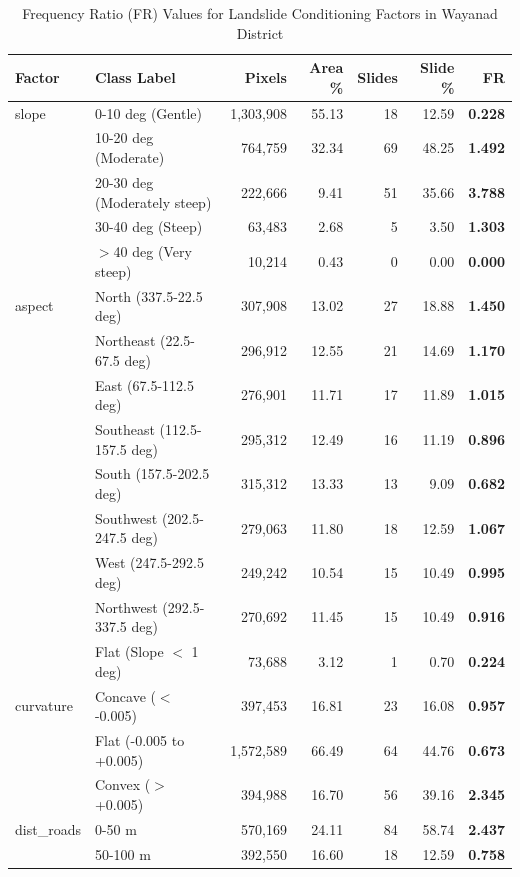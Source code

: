 \begin{table}[htbp]
\centering
\caption{Frequency Ratio (FR) Values for Landslide Conditioning Factors in Wayanad District}
\label{tab:fr_summary}
\begin{tabular}{llrrrrr}
\hline
\textbf{Factor} & \textbf{Class Label} & \textbf{Pixels} & \textbf{Area \%} & \textbf{Slides} & \textbf{Slide \%} & \textbf{FR} \\
\hline
slope & 0-10 deg (Gentle) & 1,303,908 & 55.13 & 18 & 12.59 & \textbf{0.228} \\
 & 10-20 deg (Moderate) & 764,759 & 32.34 & 69 & 48.25 & \textbf{1.492} \\
 & 20-30 deg (Moderately steep) & 222,666 & 9.41 & 51 & 35.66 & \textbf{3.788} \\
 & 30-40 deg (Steep) & 63,483 & 2.68 & 5 & 3.50 & \textbf{1.303} \\
 & $>$40 deg (Very steep) & 10,214 & 0.43 & 0 & 0.00 & \textbf{0.000} \\
aspect & North (337.5-22.5 deg) & 307,908 & 13.02 & 27 & 18.88 & \textbf{1.450} \\
 & Northeast (22.5-67.5 deg) & 296,912 & 12.55 & 21 & 14.69 & \textbf{1.170} \\
 & East (67.5-112.5 deg) & 276,901 & 11.71 & 17 & 11.89 & \textbf{1.015} \\
 & Southeast (112.5-157.5 deg) & 295,312 & 12.49 & 16 & 11.19 & \textbf{0.896} \\
 & South (157.5-202.5 deg) & 315,312 & 13.33 & 13 & 9.09 & \textbf{0.682} \\
 & Southwest (202.5-247.5 deg) & 279,063 & 11.80 & 18 & 12.59 & \textbf{1.067} \\
 & West (247.5-292.5 deg) & 249,242 & 10.54 & 15 & 10.49 & \textbf{0.995} \\
 & Northwest (292.5-337.5 deg) & 270,692 & 11.45 & 15 & 10.49 & \textbf{0.916} \\
 & Flat (Slope $<$ 1 deg) & 73,688 & 3.12 & 1 & 0.70 & \textbf{0.224} \\
curvature & Concave ($<$-0.005) & 397,453 & 16.81 & 23 & 16.08 & \textbf{0.957} \\
 & Flat (-0.005 to +0.005) & 1,572,589 & 66.49 & 64 & 44.76 & \textbf{0.673} \\
 & Convex ($>$+0.005) & 394,988 & 16.70 & 56 & 39.16 & \textbf{2.345} \\
dist\_roads & 0-50 m & 570,169 & 24.11 & 84 & 58.74 & \textbf{2.437} \\
 & 50-100 m & 392,550 & 16.60 & 18 & 12.59 & \textbf{0.758} \\

\end{tabular}
\end{table}
